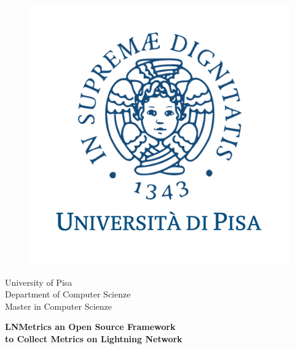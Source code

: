 \begin{titlepage}
\begin{figure}[!htb]
    \centering
    \includegraphics[keepaspectratio=true,scale=0.45]{format/img/unipi.png}
\end{figure}

\begin{center}
    \LARGE{University of Pisa}
    \vspace{5mm}
    \\ \large{Department of Computer Scienze}
    \vspace{5mm}
    \\ \LARGE{Master in Computer Scienze}
\end{center}

\vspace{15mm}
\begin{center}
    {\LARGE{\bf LNMetrics an Open Source Framework\\ \vspace{5mm} to Collect Metrics on Lightning Network }}
    
    
\end{center}
\vspace{30mm}


\end{titlepage}

